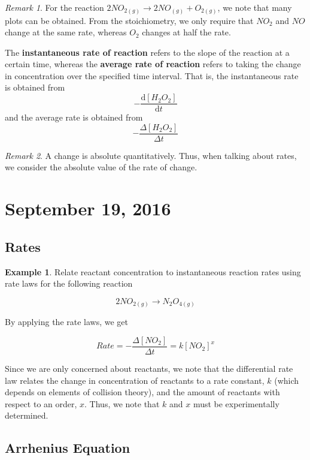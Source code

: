 \documentclass[11pt]{article}
\theoremstyle{plain} %
\theoremstyle{definition}
\theoremstyle{example}
\newtheorem*{example}{Example}
\theoremstyle{remark}
\newtheorem*{remark}{Remark}
\begin{document}
\begin{remark}
For the reaction $2NO_{2(g)} \rightarrow 2NO_{(g)} + O_{2(g)}$, we note that many plots can be obtained. From the stoichiometry, we only require that $NO_2$ and $NO$ change at the same rate, whereas $O_2$ changes at half the rate. 
\end{remark}

The \textbf{instantaneous rate of reaction} refers to the slope of the reaction at a certain time, whereas the \textbf{average rate of reaction} refers to taking the change in concentration over the specified time interval. That is, the instantaneous rate is obtained from $$-\frac{\mathrm d[H_2O_2]}{\mathrm d t}$$ and the average rate is obtained from $$-\frac{\Delta[H_2O_2]}{\Delta t}$$

\begin{remark}
A change is absolute quantitatively. Thus, when talking about rates, we consider the absolute value of the rate of change. 
\end{remark}





\section{September 19, 2016}
\subsection{Rates}

\begin{example}
Relate reactant concentration to instantaneous reaction rates using rate laws for the following reaction

$$2NO_{2(g)} \rightarrow N_2O_{4(g)}$$
\end{example}

By applying the rate laws, we get

$$Rate = -\frac{\Delta [NO_2]}{\Delta t} = k[NO_2]^x$$

Since we are only concerned about reactants, we note that the differential rate law relates the change in concentration of reactants to a rate constant, $k$ (which depends on elements of collision theory), and the amount of reactants with respect to an order, $x$. Thus, we note that $k$ and $x$ must be experimentally determined. 

\subsection{Arrhenius Equation}
\end{document}
